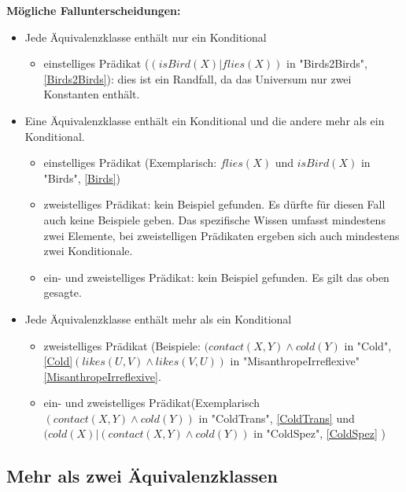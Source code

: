 \documentclass[a4paper, 11pt]{book}
\begin{document}
\textbf{Mögliche Fallunterscheidungen:} \label{Fallunterscheidung Formel 2Aequi}
\begin{itemize}
	\item Jede Äquivalenzklasse enthält nur ein Konditional 
	\begin{itemize}
		\item einstelliges Prädikat ($ (isBird(X)|flies(X)) $ in "{}Birds2Birds"{}, \ref{Birds2Birds}): dies ist ein Randfall, da das Universum nur zwei Konstanten enthält.
	\end{itemize}
	\item Eine Äquivalenzklasse enthält ein Konditional und die andere mehr als ein Konditional. 
	\begin{itemize}
		\item einstelliges Prädikat (Exemplarisch: $ flies(X) $ und $ isBird(X) $ in "{}Birds"{}, \ref{Birds}) 
		\item zweistelliges Prädikat: kein Beispiel gefunden. Es dürfte für diesen Fall auch keine Beispiele geben. Das spezifische Wissen umfasst mindestens zwei Elemente, bei zweistelligen Prädikaten ergeben sich auch mindestens zwei Konditionale.
		\item  ein- und zweistelliges Prädikat: kein Beispiel gefunden. Es gilt das oben gesagte.   
	\end{itemize}
	\item Jede Äquivalenzklasse enthält mehr als ein Konditional 
	\begin{itemize}
		\item zweistelliges Prädikat (Beispiele: $ (contact(X,Y) \land cold(Y) $ in "{}Cold"{}, \ref{Cold}$ (likes(U,V) \land likes(V,U)) $ in "{}MisanthropeIrreflexive"{} \ref{MisanthropeIrreflexive}.  
		\item ein- und zweistelliges Prädikat(Exemplarisch $ (contact(X,Y) \land cold(Y)) $ in "{}ColdTrans"{}, \ref{ColdTrans} und  $  (cold(X) | (contact(X,Y) \land cold(Y)) $ in "{}ColdSpez"{}, \ref{ColdSpez} ) 
	\end{itemize}
\end{itemize}


\subsection{Mehr als zwei Äquivalenzklassen} 
\end{document}
